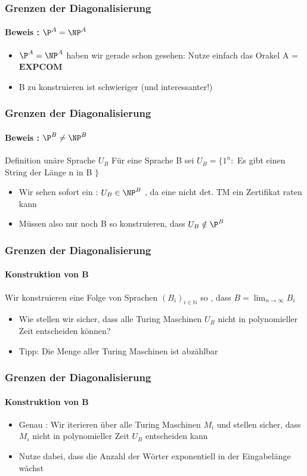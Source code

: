 \begin{frame}
	\frametitle{Grenzen der Diagonalisierung}
	\framesubtitle{Beweis : ${\P}^A = {\NP}^A$ }
	\begin{itemize}[<+->]
	
	\item ${\P}^A = {\NP}^A$ haben wir gerade schon gesehen:
			Nutze einfach das Orakel A = $\mathbf{EXPCOM}$
	\item B zu konstruieren ist schwieriger (und interessanter!)
	\end{itemize}	
\end{frame}

\begin{frame}
	\frametitle{Grenzen der Diagonalisierung}
	\framesubtitle{Beweis : ${\P}^B \neq {\NP}^B$}
	\begin{KITinfoblock}{Definition unäre Sprache $U_B$}
		Für eine Sprache B sei $U_B = \lbrace 1^n :$ Es gibt einen String
		der L\"ange n in B $\rbrace $
	\end{KITinfoblock}	
	\pause
	
	\begin{itemize}[<+->]
		\item Wir sehen sofort ein : $U_B \in {\NP}^B$ , da eine nicht det. TM
			ein Zertifikat raten kann
		\item M\"ussen also nur noch B so konstruieren, dass $U_B \notin {\P}^B$
	\end{itemize}
\end{frame}

\begin{frame}
	\frametitle{Grenzen der Diagonalisierung}
	\framesubtitle{Konstruktion von B}
	Wir konstruieren eine Folge von Sprachen $(B_i)_{i \in \mathbb{N}}$ so , dass 
	$B = \lim_{n \to \infty} B_i$	
	\begin{itemize}[<+->]
		\item Wie stellen wir sicher, dass alle Turing Maschinen $U_B$ nicht
			in polynomieller Zeit entscheiden können?
		\item Tipp: Die Menge aller Turing Maschinen ist abzählbar
	\end{itemize}
\end{frame}

\begin{frame}
	\frametitle{Grenzen der Diagonalisierung}
	\framesubtitle{Konstruktion von B}
	\begin{itemize}[<+->]
	\item Genau : Wir iterieren über alle Turing Maschinen $M_i$ und stellen
	sicher, dass $M_i$ nicht in polynomieller Zeit $U_B$ entscheiden kann
	\item Nutze dabei, dass die Anzahl der Wörter exponentiell in der Eingabelänge wächst
	\end{itemize}
\end{frame}

